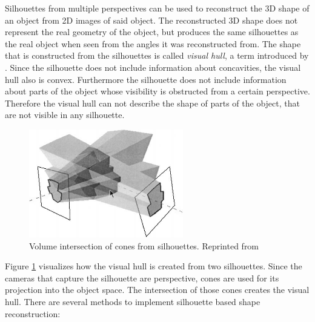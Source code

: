 Silhouettes from multiple perspectives can be used to reconstruct the \ac{3D} shape of an object from \ac{2D} images of said object.
The reconstructed \ac{3D} shape does not represent the real geometry of the object, but produces the same silhouettes as the real object when seen from the angles it was reconstructed from.
The shape that is constructed from the silhouettes is called \emph{visual hull}, a term introduced by \textcite[][]{laurentini1994hull}.
Since the silhouette does not include information about concavities,
the visual hull also is convex. 
Furthermore the silhouette does not include information about parts of the object whose visibility is obstructed from a certain perspective.
Therefore the visual hull can not describe the shape of parts of the object, that are not visible in any silhouette.

\begin{figure}[hbt]
	\centering
	\includegraphics[width=0.6\textwidth, keepaspectratio]{resources/volume_intersection_bottino}
	\caption[Volume intersection of cones from silhouettes]{\label{fig:sota:volumeintersection} Volume intersection of cones from silhouettes.
	Reprinted from \textcite[][]{bottino2001silhouette}}
\end{figure}

Figure \ref{fig:sota:volumeintersection} visualizes how the visual hull is created from two silhouettes. 
Since the cameras that capture the silhouette are perspective,
cones are used for its projection into the object space.
The intersection of those cones creates the visual hull.
There are several methods to implement silhouette based shape reconstruction:

